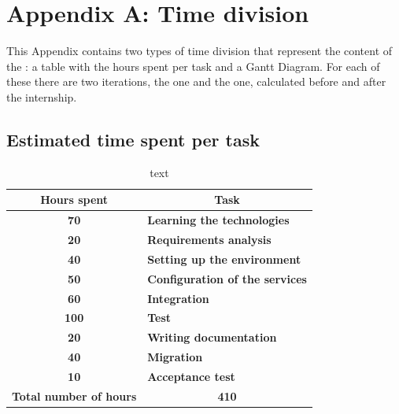 \renewcommand\thechapter{A}
\chapter{Appendix A: Time division}
\label{AppendixA}

This Appendix contains two types of time division that represent the content of the : a table with the hours spent per task and a Gantt Diagram.
For each of these there are two iterations, the  one and the  one, calculated before and after the internship.

\section{Estimated time spent per task}
	\begin{table}[H]
		\begin{tabularx}{\textwidth}{c|X}
			\centering\textbf{Hours spent} & \multicolumn{1}{c}{\textbf{Task}}\\\hline
			\textbf{70}&\textbf{Learning the technologies}\\\hline
			\textbf{20}&\textbf{Requirements analysis}\\\hline
			\textbf{40}&\textbf{Setting up the environment}\\\hline
			\textbf{50}&\textbf{Configuration of the services}\\\hline
			\textbf{60}&\textbf{Integration}\\\hline
			\textbf{100}&\textbf{Test}\\\hline
			\textbf{20}&\textbf{Writing documentation}\\\hline
			\textbf{40}&\textbf{Migration}\\\hline
			\textbf{10}&\textbf{Acceptance test}\\\hline
			\textbf{Total number of hours}&\multicolumn{1}{c}{\textbf{410}} \\	
		\end{tabularx}
		\caption{text}
	\end{table}

